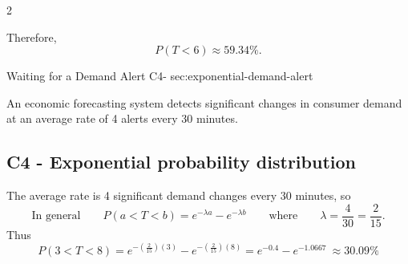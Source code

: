 \begin{multicols}{2}
{			Therefore,
			\[
			\boxed{P(T<6)\approx59.34\%}.
			\]
			

		}
		
	\end{multicols}
	
	\sectionScored
	{Waiting for a Demand Alert}
	{C4-}
	{sec:exponential-demand-alert}
	{
		An economic forecasting system detects significant changes in consumer
		demand at an average rate of 4 alerts every 30 minutes.
		
		
		\label{subsec:exponential-demand-alert-probability}
		\subsection*{C4 - Exponential probability distribution }
		
		The average rate is 4 significant demand changes every \(30\) minutes, so
		\[
		\text{In general} \qquad P(a<T<b)=e^{-\lambda a}-e^{-\lambda b} 
		\qquad \text{where} \qquad \lambda=\frac{4}{30}=\frac{2}{15}.
		\]
		Thus
		\[
		P(3<T<8)
		=
		e^{-\left(\frac{2}{15}\right)(3)}
		-
		e^{-\left(\frac{2}{15}\right)(8)}
		=e^{-0.4}-e^{-1.0667} \>
		\boxed{\approx30.09\%}
		\]
		
	}
	
	
